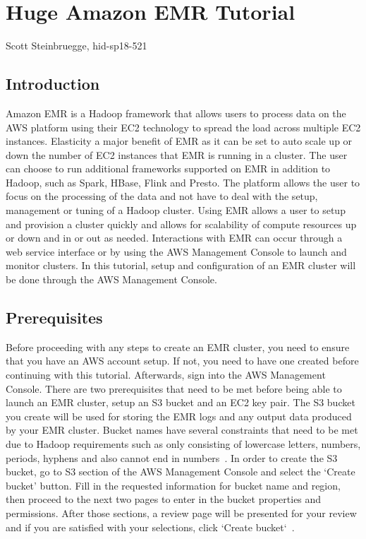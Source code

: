 
\chapter{Huge Amazon EMR Tutorial}

Scott Steinbruegge, hid-sp18-521

\section{Introduction}

Amazon EMR is a Hadoop framework that allows users to process data on the AWS 
platform using their EC2 technology to spread the load across multiple EC2 
instances. Elasticity a major benefit of EMR as it can be set to auto scale 
up or down the number of EC2 instances that EMR is running in a cluster. The 
user can choose to run additional frameworks supported on EMR in addition 
to Hadoop, such as Spark, HBase, Flink and Presto. The platform allows the 
user to focus on the processing of the data and not have to deal with the 
setup, management or tuning of a Hadoop cluster. Using EMR allows a user 
to setup and provision a cluster quickly and allows for scalability of 
compute resources up or down and in or out as needed. Interactions with 
EMR can occur through a web service interface or by using the AWS 
Management Console to launch and monitor clusters. In this tutorial, 
setup and configuration of an EMR cluster will be done through the AWS 
Management Console. 

\section{Prerequisites}

Before proceeding with any steps to create an EMR cluster, you need to 
ensure that you have an AWS account setup. If not, you need to have one 
created before continuing with this tutorial. Afterwards, sign into the 
AWS Management Console. There are two prerequisites that need to be met 
before being able to launch an EMR cluster, setup an S3 bucket and an EC2 
key pair. The S3 bucket you create will be used for storing the EMR logs 
and any output data produced by your EMR cluster. Bucket names have several 
constraints that need to be met due to Hadoop requirements such as only 
consisting of lowercase letters, numbers, periods, hyphens and also cannot 
end in numbers~\cite{hid-sp18-521-prereq}. In order to create the S3 bucket, 
go to S3 section of the AWS Management Console and select the `Create bucket' 
button. Fill in the requested information for bucket name and region, then 
proceed to the next two pages to enter in the bucket properties and 
permissions. After those sections, a review page will be presented for your 
review and if you are satisfied with your selections, 
click `Create bucket`~\cite{hid-sp18-521-s3bucket}. 

